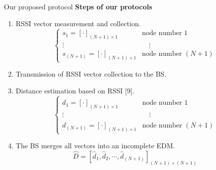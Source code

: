 \documentclass{beamer}
\begin{document}
\begin{frame}[t]{Our proposed protocol} %
\textbf{Steps of our protocols}
\begin{enumerate}
\justifying
\small
\item RSSI vector measurement and collection.
\begin{equation}
        \left\{ \begin{array}{ll}
    		\hat{s}_{1}=[\cdot]_{(N+1)\times1}     & \textrm{node number $1$}\\
    		\vdots                                  & \quad \vdots \\
    		\hat{s}_{(N+1)}=[\cdot]_{(N+1)\times1}   & \textrm{node number $(N+1)$}
        \end{array} \right.
\end{equation}
\item Transmission of RSSI vector collection to the BS.
\item Distance estimation based on RSSI [9].
\begin{equation}
        \left\{ \begin{array}{ll}
    		\hat{d}_{1}=[\cdot]_{(N+1)\times1}     & \textrm{node number $1$}\\
    	    \vdots                            &\quad \vdots \\
    		\hat{d}_{(N+1)}=[\cdot]_{(N+1)\times1}   & \textrm{node number $(N+1)$}
        \end{array} \right.
\end{equation}
\item The BS merges all vectors into an incomplete EDM.
\begin{equation}
\hat{D}=[\hat{d}_{1},\hat{d}_{2},\cdots,\hat{d}_{(N+1)}]_{(N+1)\times(N+1)}
\end{equation}
\end{enumerate}		
\end{frame}
\end{document}
